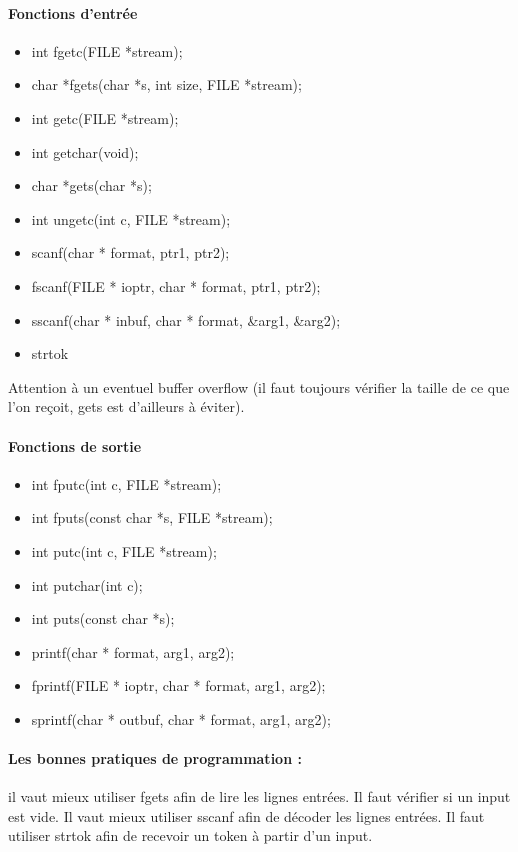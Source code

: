 \documentclass{article}[12pt]
\begin{document}
\paragraph{Fonctions d'entrée}
\begin{itemize}
	\item int fgetc(FILE *stream);
	\item char *fgets(char *s, int size, FILE *stream);
	\item int getc(FILE *stream);
	\item int getchar(void);
	\item char *gets(char *s);
	\item int ungetc(int c, FILE *stream);
	\item scanf(char * format, ptr1, ptr2);
	\item fscanf(FILE * ioptr, char * format, ptr1, ptr2);
	\item sscanf(char * inbuf, char * format, \&arg1, \&arg2);
	\item strtok 
\end{itemize}   
Attention à un eventuel buffer overflow (il faut toujours vérifier la taille de ce que l'on reçoit, gets est d'ailleurs à éviter).
\paragraph{Fonctions de sortie}
\begin{itemize}
	\item int fputc(int c, FILE *stream);
	\item int fputs(const char *s, FILE *stream);
	\item int putc(int c, FILE *stream);
	\item int putchar(int c);
	\item int puts(const char *s);
	\item printf(char * format, arg1, arg2);
	\item fprintf(FILE * ioptr, char * format, arg1, arg2);
	\item sprintf(char * outbuf, char * format, arg1, arg2); 
\end{itemize}
\paragraph{Les bonnes pratiques de programmation : } il vaut mieux utiliser fgets afin de lire les lignes entrées. Il faut vérifier si un input est vide. Il vaut mieux utiliser sscanf afin de décoder les lignes entrées. Il faut utiliser strtok afin de recevoir un token à partir d'un input.
\end{document}
